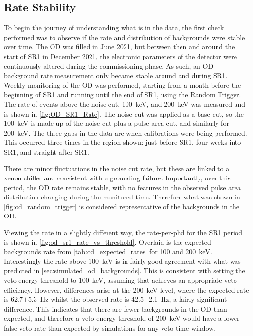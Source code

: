 \subsection{Rate Stability}
\par
To begin the journey of understanding what is in the data, the first check performed was to observe if the rate and distribution of backgrounds were stable over time.
The OD was filled in June 2021, but between then and around the start of SR1 in December 2021, the electronic parameters of the detector were continuously altered during the commissioning phase.
As such, an OD background rate measurement only became stable around and during SR1.
Weekly monitoring of the OD was performed, starting from a month before the beginning of SR1 and running until the end of SR1, using the Random Trigger.
The rate of events above the noise cut, 100~keV, and 200~keV was measured and is shown in \autoref{fig:OD_SR1_Rate}.
The noise cut was applied as a base cut, so the 100~keV is made up of the noise cut plus a pulse area cut, and similarly for 200~keV.
The three gaps in the data are when calibrations were being performed.
This occurred three times in the region shown: just before SR1, four weeks into SR1, and straight after SR1.
\par
There are minor fluctuations in the noise cut rate, but these are linked to a xenon chiller and consistent with a grounding failure.
Importantly, over this period, the OD rate remains stable, with no features in the observed pulse area distribution changing during the monitored time.
Therefore what was shown in \autoref{fig:od_random_trigger} is considered representative of the backgrounds in the OD.
\par
Viewing the rate in a slightly different way, the rate-per-phd for the SR1 period is shown in \autoref{fig:od_sr1_rate_vs_threshold}.
Overlaid is the expected backgrounds rate from \autoref{tab:od_expected_rates} for 100 and 200~keV.
Interestingly the rate above 100~keV is in fairly good agreement with what was predicted in \autoref{sec:simulated_od_backgrounds}.
This is consistent with setting the veto energy threshold to 100~keV, assuming that achieves an appropriate veto efficiency.
However, differences arise at the 200~keV level, where the expected rate is 62.7$\pm$5.3~Hz whilst the observed rate is 42.5$\pm$2.1~Hz, a fairly significant difference.
This indicates that there are fewer backgrounds in the OD than expected, and therefore a veto energy threshold of 200~keV would have a lower false veto rate than expected by simulations for any veto time window.

